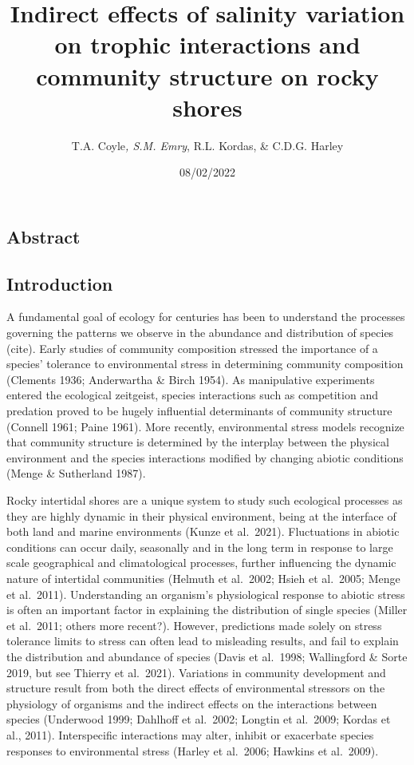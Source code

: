 \documentclass[
  11pt,
]{article}
\title{Indirect effects of salinity variation on trophic interactions and community structure on rocky shores}
\author{T.A. Coyle\emph{, S.M. Emry}, R.L. Kordas, \& C.D.G. Harley}
\date{08/02/2022}
\begin{document}
\maketitle

{
\setcounter{tocdepth}{2}
\tableofcontents
}
\hypertarget{abstract}{%
\subsection{Abstract}\label{abstract}}

\hypertarget{introduction}{%
\subsection{Introduction}\label{introduction}}

A fundamental goal of ecology for centuries has been to understand the processes governing the patterns we observe in the abundance and distribution of species (cite). Early studies of community composition stressed the importance of a species' tolerance to environmental stress in determining community composition (Clements 1936; Anderwartha \& Birch 1954). As manipulative experiments entered the ecological zeitgeist, species interactions such as competition and predation proved to be hugely influential determinants of community structure (Connell 1961; Paine 1961). More recently, environmental stress models recognize that community structure is determined by the interplay between the physical environment and the species interactions modified by changing abiotic conditions (Menge \& Sutherland 1987).

Rocky intertidal shores are a unique system to study such ecological processes as they are highly dynamic in their physical environment, being at the interface of both land and marine environments (Kunze et al.~2021). Fluctuations in abiotic conditions can occur daily, seasonally and in the long term in response to large scale geographical and climatological processes, further influencing the dynamic nature of intertidal communities (Helmuth et al.~2002; Hsieh et al.~2005; Menge et al.~2011). Understanding an organism's physiological response to abiotic stress is often an important factor in explaining the distribution of single species (Miller et al.~2011; others more recent?). However, predictions made solely on stress tolerance limits to stress can often lead to misleading results, and fail to explain the distribution and abundance of species (Davis et al.~1998; Wallingford \& Sorte 2019, but see Thierry et al.~2021). Variations in community development and structure result from both the direct effects of environmental stressors on the physiology of organisms and the indirect effects on the interactions between species (Underwood 1999; Dahlhoff et al.~2002; Longtin et al.~2009; Kordas et al., 2011). Interspecific interactions may alter, inhibit or exacerbate species responses to environmental stress (Harley et al.~2006; Hawkins et al.~2009).
\end{document}
